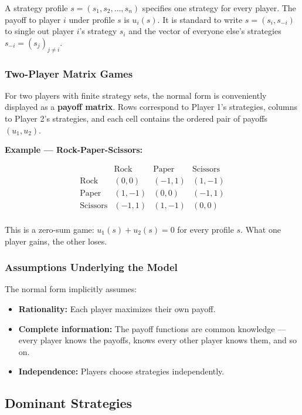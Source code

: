 \documentclass[hidelinks]{article}
\begin{document}
A strategy profile $s = (s_1, s_2, \ldots, s_n)$ specifies one strategy for every player. The payoff to player $i$ under profile $s$ is $u_i(s)$. It is standard to write $s = (s_i, s_{-i})$ to single out player $i$'s strategy $s_i$ and the vector of everyone else's strategies $s_{-i} = (s_j)_{j \neq i}$.

\subsubsection{Two-Player Matrix Games}

For two players with finite strategy sets, the normal form is conveniently displayed as a \textbf{payoff matrix}. Rows correspond to Player 1's strategies, columns to Player 2's strategies, and each cell contains the ordered pair of payoffs $(u_1, u_2)$.

\textbf{Example — Rock-Paper-Scissors:}

\[
\begin{array}{c|ccc}
 & \text{Rock} & \text{Paper} & \text{Scissors} \\
\hline
\text{Rock}     & (0,0)  & (-1,1) & (1,-1) \\
\text{Paper}    & (1,-1) & (0,0)  & (-1,1) \\
\text{Scissors} & (-1,1) & (1,-1) & (0,0) \\
\end{array}
\]

This is a zero-sum game: $u_1(s) + u_2(s) = 0$ for every profile $s$. What one player gains, the other loses.

\subsubsection{Assumptions Underlying the Model}

The normal form implicitly assumes:
\begin{itemize}
    \item \textbf{Rationality:} Each player maximizes their own payoff.
    \item \textbf{Complete information:} The payoff functions are common knowledge — every player knows the payoffs, knows every other player knows them, and so on.
    \item \textbf{Independence:} Players choose strategies independently.
\end{itemize}

\subsection{Dominant Strategies}
\end{document}
